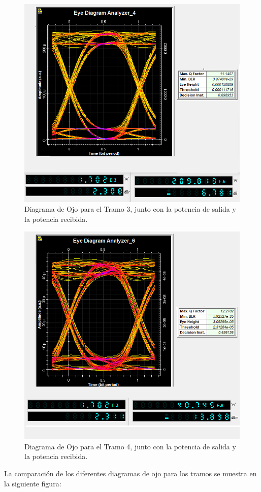 \begin{itemize}
\begin{figure}[H]
	\centering
	\includegraphics[width=0.6\linewidth]{img/ejemplos/Figure_10}
	\caption{Diagrama de Ojo para el Tramo 3, junto con la potencia de salida y la potencia recibida.}
	\label{fig:optisystem_eye3}
\end{figure}

\begin{figure}[H]
	\centering
	\includegraphics[width=0.6\linewidth]{img/ejemplos/Figure_11}
	\caption{Diagrama de Ojo para el Tramo 4, junto con la potencia de salida y la potencia recibida.}
	\label{fig:optisystem_eye4}
\end{figure}

La comparación de los diferentes diagramas de ojo para los tramos se muestra en la siguiente figura:


\end{itemize}
